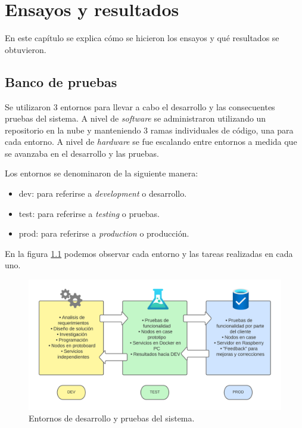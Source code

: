 
\chapter{Ensayos y resultados} %

\label{Chapter4} %

En este capítulo se explica cómo se hicieron los ensayos y qué resultados se obtuvieron.

\section{Banco de pruebas}
\label{sec:entornos}

Se utilizaron 3 entornos para llevar a cabo el desarrollo y las consecuentes pruebas del sistema. A nivel de \textit{software} se administraron utilizando un repositorio en la nube y manteniendo 3 ramas individuales de código, una para cada entorno. A nivel de \textit{hardware} se fue escalando entre entornos a medida que se avanzaba en el desarrollo y las pruebas.

Los entornos se denominaron de la siguiente manera:
\begin{itemize}
\item dev: para referirse a \textit{development} o desarrollo.
\item test: para referirse a \textit{testing} o pruebas.
\item prod: para referirse a \textit{production} o producción.
\end{itemize}

En la figura \ref{fig:entornos} podemos observar cada entorno y las tareas realizadas en cada uno.

\begin{figure}[H]
	\centering
	\includegraphics[scale=.15]{./Figures/diagrama-entornos.png}
	\caption{Entornos de desarrollo y pruebas del sistema.}
	\label{fig:entornos}
\end{figure}

